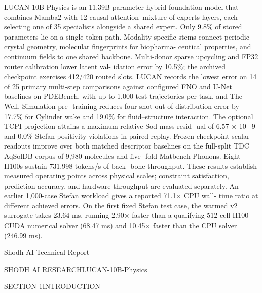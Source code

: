\documentclass[11pt]{article}
\begin{document}
LUCAN-10B-Physics is an 11.39B-parameter hybrid foundation model
that combines Mamba2 with 12 causal attention–mixture-of-experts layers,
each selecting one of 35 specialists alongside a shared expert. Only 9.8\%
of stored parameters lie on a single token path. Modality-specific stems
connect periodic crystal geometry, molecular fingerprints for biopharma-
ceutical properties, and continuum fields to one shared backbone.
Multi-donor sparse upcycling and FP32 router calibration lower latent val-
idation error by 10.5\%; the archived checkpoint exercises 412/420 routed
slots. LUCAN records the lowest error on 14 of 25 primary multi-step
comparisons against configured FNO and U-Net baselines on PDEBench,
with up to 1,000 test trajectories per task, and The Well. Simulation pre-
training reduces four-shot out-of-distribution error by 17.7\% for Cylinder
wake and 19.0\% for fluid–structure interaction.
The optional TCPI projection attains a maximum relative Sod mass resid-
ual of 6.57 \ensuremath{\times} 10\ensuremath{-}9 and 0.0\% Stefan positivity violations in paired replay.
Frozen-checkpoint scalar readouts improve over both matched descriptor
baselines on the full-split TDC AqSolDB corpus of 9,980 molecules and five-
fold Matbench Phonons. Eight H100s sustain 731,998 tokens/s of back-
bone throughput. These results establish measured operating points across
physical scales; constraint satisfaction, prediction accuracy, and hardware
throughput are evaluated separately.
An earlier 1,000-case Stefan workload gives a reported 71.1\ensuremath{\times} CPU wall-
time ratio at different achieved errors. On the first fixed Stefan test case,
the warmed v2 surrogate takes 23.64 ms, running 2.90\ensuremath{\times} faster than a
qualifying 512-cell H100 CUDA numerical solver (68.47 ms) and 10.45\ensuremath{\times}
faster than the CPU solver (246.99 ms).





\noindent Shodh AI Technical Report\par




\noindent SHODH AI RESEARCH\quad LUCAN-10B-Physics\par




\noindent SECTION 1\quad INTRODUCTION\par
\end{document}
